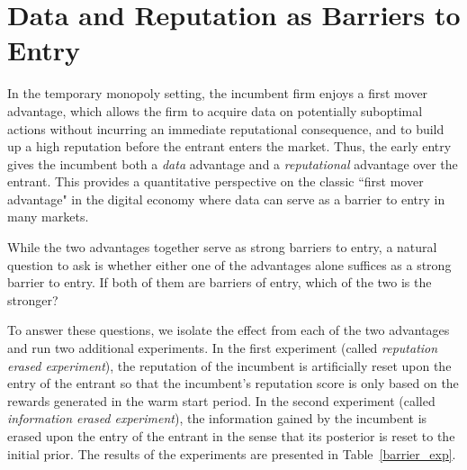 \documentclass[../competing_bandits.tex]{subfiles}
\begin{document}
\section{Data and Reputation as Barriers to Entry}\label{section:6}
In the temporary monopoly setting, the incumbent firm enjoys a first
mover advantage, which allows the firm to acquire data on potentially
suboptimal actions without incurring an immediate reputational
consequence, and to build up a high reputation before the entrant
enters the market. Thus, the early entry gives the incumbent both a
\textit{data} advantage and a \textit{reputational} advantage over the
entrant. This provides a quantitative perspective on the classic
``first mover advantage" \cite{kerin1992first} in the digital economy
where data can serve as a barrier to entry in many markets.

While the two advantages together serve as strong barriers to entry, a
natural question to ask is whether either one of the advantages alone
suffices as a strong barrier to entry. If both of them are barriers of
entry, which of the two is the stronger?

To answer these questions, we isolate the effect from each of the two
advantages and run two additional experiments. In the first experiment
(called \emph{reputation erased experiment}), the reputation of the
incumbent is artificially reset upon the entry of the entrant {so that
  the incumbent's reputation score is only based on the rewards
  generated in the warm start period}. In the second experiment
(called \emph{information erased experiment}), the information gained
by the incumbent is erased upon the entry of the entrant in the sense
that its posterior is reset to the initial prior. The results of the
experiments are presented in Table~\ref{barrier_exp}.
\end{document}
